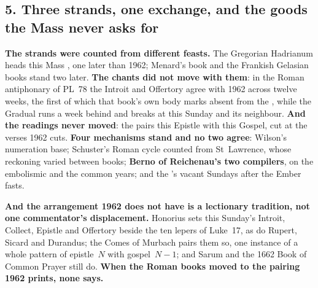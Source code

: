 \subsection*{5. Three strands, one exchange, and the goods the Mass never asks for}

\textbf{The strands were counted from different feasts.} The Gregorian Hadrianum
heads this Mass , one later than 1962;
Menard's book and the Frankish Gelasian books stand two later.
\textbf{The chants did not move with them}: in the Roman antiphonary of PL~78
the Introit and Offertory agree with 1962 across twelve weeks, the first of
which that book's own body marks absent from the ,
while the Gradual runs a week behind and breaks at this Sunday and its
neighbour.
\textbf{And the readings never moved}: the  pairs this
Epistle with this Gospel, cut at the verses 1962 cuts. \textbf{Four mechanisms stand and no two agree}: Wilson's numeration base;
Schuster's Roman cycle counted from St~Lawrence, whose reckoning varied between
books; \textbf{Berno of Reichenau's two compilers}, on the embolismic and the
common years; and the 's vacant Sundays after the Ember
fasts.

\textbf{And the arrangement 1962 does not have is a lectionary tradition, not
one commentator's displacement.} Honorius sets this Sunday's Introit, Collect,
Epistle and Offertory beside the ten lepers of Luke~17, as do Rupert, Sicard
and Durandus; the Comes of Murbach pairs them so, one instance of a whole
pattern of epistle~$N$ with gospel~$N{-}1$; and Sarum and the 1662 Book of
Common Prayer still do.
\textbf{When the Roman books moved to the pairing 1962 prints, none
says.}

